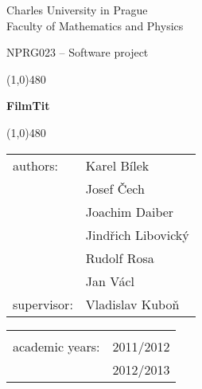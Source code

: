 \begin{titlepage}
\begin{center}
\sc \Large Charles University in Prague \\
Faculty of Mathematics and Physics
\end{center}

\vspace{0.5cm}

\begin{center}
\huge NPRG023 -- Software project
\end{center}

\vspace{1.5cm}

\noindent\line(1,0){480}

\vspace{0.3cm}

\begin{center}
\hfill\fontsize{40mm}{40mm}\bf\sf FilmTit
\end{center}

\noindent\line(1,0){480}

\vspace{5.25cm}

{\noindent\Large
\begin{tabular}{ll}
authors: & Karel Bílek \\
& Josef Čech \\
& Joachim Daiber \\
& Jindřich Libovický \\
& Rudolf Rosa \\
& Jan Václ\vspace*{0.4cm} \\
supervisor: & Vladislav Kuboň
\end{tabular}
\hfill\begin{tabular}{ll}
\vspace*{3.4cm}& \\
academic years: & 2011/2012\\
& 2012/2013
\end{tabular}}


\end{titlepage}
